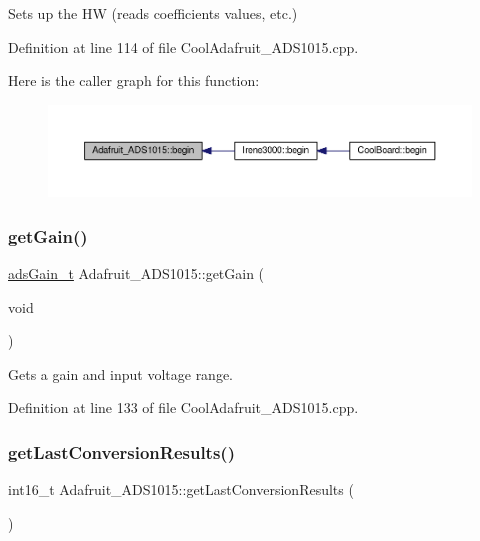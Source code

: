 Sets up the HW (reads coefficients values, etc.) 



Definition at line 114 of file Cool\+Adafruit\+\_\+\+A\+D\+S1015.\+cpp.

Here is the caller graph for this function\+:
\nopagebreak
\begin{figure}[H]
\begin{center}
\leavevmode
\includegraphics[width=350pt]{class_adafruit___a_d_s1015_a6eba7c3cd854927f60883bb371e5faa6_icgraph}
\end{center}
\end{figure}
\mbox{\label{class_adafruit___a_d_s1015_a6232d089aaa82226bc34623fdf92237c}} 
\subsubsection{\texorpdfstring{get\+Gain()}{getGain()}}
{\footnotesize\ttfamily \hyperlink{_cool_adafruit___a_d_s1015_8h_a3d6c0e15829a207b9155890811fa4781}{ads\+Gain\+\_\+t} Adafruit\+\_\+\+A\+D\+S1015\+::get\+Gain (\begin{DoxyParamCaption}\item[{void}]{ }\end{DoxyParamCaption})}



Gets a gain and input voltage range. 



Definition at line 133 of file Cool\+Adafruit\+\_\+\+A\+D\+S1015.\+cpp.

\mbox{\label{class_adafruit___a_d_s1015_ad8f36d80847020778425107f6451a8c2}} 
\subsubsection{\texorpdfstring{get\+Last\+Conversion\+Results()}{getLastConversionResults()}}
{\footnotesize\ttfamily int16\+\_\+t Adafruit\+\_\+\+A\+D\+S1015\+::get\+Last\+Conversion\+Results (\begin{DoxyParamCaption}{ }\end{DoxyParamCaption})}



